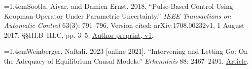 \hypertarget{ref:sootla2018}{}\hangindent=1.4em\noindent Sootla, Aivar, and Damien Ernst. 2018. “Pulse-Based Control Using Koopman Operator Under Parametric Uncertainty.” \emph{IEEE Transactions on Automatic Control} 63(3): 791–796. Version cited: arXiv:\allowbreak{}1708.00232v1, 1 August 2017, §§III.B–III.C, pp. 3–5. \href{https://arxiv.org/pdf/1708.00232v1}{Author preprint, v1}.

\hypertarget{ref:weinberger2023}{}\hangindent=1.4em\noindent Weinberger, Naftali. 2023 [online 2021]. “Intervening and Letting Go: On the Adequacy of Equilibrium Causal Models.” \emph{Erkenntnis} 88: 2467–2491. \href{https://doi.org/10.1007/s10670-021-00463-0}{Article}.
\endgroup
